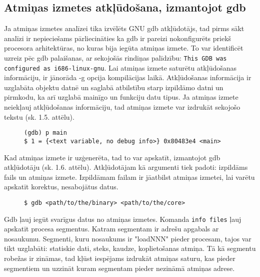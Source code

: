\subsection{Atmiņas izmetes atkļūdošana, izmantojot gdb }
 \label{subsec:debugg_gdb}
Ja atmiņas izmetes analīzei tika izvēlēts GNU gdb atkļūdotājs, tad pirms sākt analīzi ir nepieciešams pārliecināties ka gdb ir pareizi nokonfigurēts priekš procesora arhitektūras, no kuras bija iegūta atmiņas izmete.
To var identificēt uzreiz pēc gdb palaišanas, ar sekojošās rindiņas palīdzību: \texttt{This GDB was configured as i686-linux-gnu}.  
Lai atmiņas izmete saturētu atkļūdošanas informāciju, ir jānorāda -g opcija kompilācijas laikā.
Atkļūdošanas informācija ir uzglabāta objektu datnē un saglabā atbilstību starp izpildāmo datni un pirmkodu, ka arī uzglabā mainīgo un funkciju datu tipus.
Ja atmiņas izmete neiekļauj atkļūdošanas informāciju, tad atmiņas izmete var izdrukāt sekojošo tekstu (sk. 1.5. attēlu).

\begin{figure}[h]
\begin{lstlisting}[style=customgdb]
(gdb) p main
$ 1 = {<text variable, no debug info>} 0x80483e4 <main>
\end{lstlisting}
\caption{\textbf{\fontsize{11}{12}\selectfont {Atmiņas izmete nesatur atkļūdošanas informāciju}}}
\end{figure}

Kad atmiņas izmete ir uzģenerēta, tad to var apskatīt, izmantojot gdb atkļūdotāju (sk. 1.6. attēlu). 
Atkļūdotājam kā argumenti tiek padoti: izpildāms fails un atmiņas izmete. 
Izpildāmam failam ir jāatbilst atmiņas izmetei, lai varētu apskatīt korektus, nesabojātus datus.

\begin{figure}[h]
\begin{lstlisting}[style=customgdb]
$ gdb <path/to/the/binary> <path/to/the/core>
\end{lstlisting}
\caption{\textbf{\fontsize{11}{12}\selectfont {Atmiņas izmetes atvēršana, izmantojot gdb atkļūdotāju}}}
\end{figure}

Gdb ļauj iegūt svarīgus datus no atmiņas izmetes. Komanda \texttt{info files} ļauj apskatīt procesa segmentus. 
Katram segmentam ir adrešu apgabals ar nosaukumu. 
Segmenti, kuru nosaukums ir "loadNNN" pieder procesam, tajos var tikt uzglabāti: statiskie dati, steks, kaudze, koplietošanas atmiņa.
Tā kā segmentu robežas ir zināmas, tad kļūst iespējams izdrukāt atmiņas saturu, kas pieder segmentiem un uzzināt kuram segmentam pieder nezināmā atmiņas adrese.


